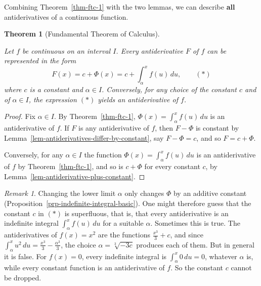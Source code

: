 \documentclass[
  letterpaper,
  DIV=11,
  numbers=noendperiod]{scrreprt}
\theoremstyle{plain}
\theoremstyle{plain}
\theoremstyle{definition}
\theoremstyle{definition}
\theoremstyle{definition}
\theoremstyle{plain}
\newtheorem{theorem}{Theorem}[chapter]
\theoremstyle{plain}
\theoremstyle{remark}
\newtheorem{refremark}{Remark}[chapter]
\begin{document}
Combining Theorem~\ref{thm-ftc-1} with the two lemmas, we can describe
\textbf{all} antiderivatives of a continuous function.

\begin{theorem}[Fundamental Theorem of
Calculus]\protect\hypertarget{thm-ftc}{}\label{thm-ftc}

Let \(f\) be continuous on an interval \(I\). Every antiderivative \(F\)
of \(f\) can be represented in the form \[
F(x) = c + \Phi(x) = c + \int_\alpha^x f(u)\,du, \qquad (\ast)
\] where \(c\) is a constant and \(\alpha\in I\). Conversely, for any
choice of the constant \(c\) and of \(\alpha\in I\), the expression
\((\ast)\) yields an antiderivative of \(f\).

\end{theorem}

\begin{proof}
Fix \(\alpha\in I\). By Theorem~\ref{thm-ftc-1},
\(\Phi(x)=\int_\alpha^x f(u)\,du\) is an antiderivative of \(f\). If
\(F\) is any antiderivative of \(f\), then \(F-\Phi\) is constant by
Lemma~\ref{lem-antiderivatives-differ-by-constant}, say \(F-\Phi=c\),
and so \(F = c+\Phi\).

Conversely, for any \(\alpha\in I\) the function
\(\Phi(x) = \int_\alpha^x f(u)\,du\) is an antiderivative of \(f\) by
Theorem~\ref{thm-ftc-1}, and so is \(c+\Phi\) for every constant \(c\),
by Lemma~\ref{lem-antiderivative-plus-constant}.
\end{proof}

\begin{refremark}
Changing the lower limit \(\alpha\) only changes \(\Phi\) by an additive
constant (Proposition~\ref{prp-indefinite-integral-basic}). One might
therefore guess that the constant \(c\) in \((\ast)\) is superfluous,
that is, that every antiderivative is an indefinite integral
\(\int_\alpha^x f(u)\,du\) for a suitable \(\alpha\). Sometimes this is
true. The antiderivatives of \(f(x)=x^2\) are the functions
\(\frac{x^3}{3}+c\), and since
\(\int_\alpha^x u^2\,du = \frac{x^3}{3}-\frac{\alpha^3}{3}\), the choice
\(\alpha = \sqrt[3]{-3c}\) produces each of them. But in general it is
false. For \(f(x)=0\), every indefinite integral is
\(\int_\alpha^x 0\,du = 0\), whatever \(\alpha\) is, while every
constant function is an antiderivative of \(f\). So the constant \(c\)
cannot be dropped.

\label{rem-constant-needed}

\end{refremark}
\end{document}
